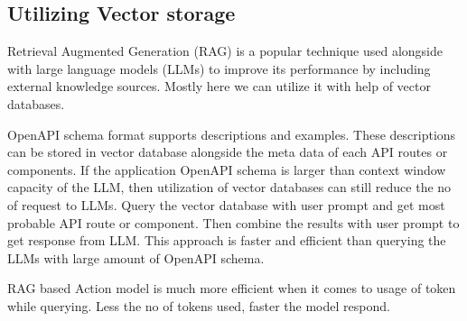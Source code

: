 \documentclass[conference]{IEEEtran}
\begin{document}


\subsection{Utilizing Vector storage}
Retrieval Augmented Generation (RAG) is a popular technique used alongside with
large language models (LLMs) to improve its performance by including external
knowledge sources. Mostly here we can utilize it with help of vector databases.

OpenAPI schema format supports descriptions and examples. These descriptions
can be stored in vector database alongside the meta data of each API routes or
components. If the application OpenAPI schema is larger than context window
capacity of the LLM, then utilization of vector databases can still reduce the
no of request to LLMs. Query the vector database with user prompt and get most
probable API route or component. Then combine the results with user prompt to
get response from LLM. This approach is faster and efficient than querying the
LLMs with large amount of OpenAPI schema.

RAG based Action model is much more efficient when it comes to usage of token
while querying. Less the no of tokens used, faster the model respond.
\end{document}
